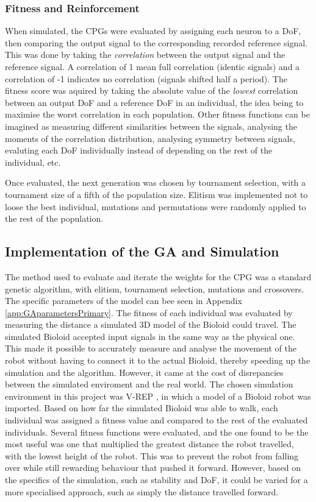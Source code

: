 \subsubsection{Fitness and Reinforcement}
When simulated, the CPGs were evaluated by assigning each neuron to a DoF, then comparing the output signal to the corresponding recorded reference signal. This was done by taking the \textit{correlation} between the output signal and the reference signal. A correlation of 1 mean full correlation (identic signals) and a correlation of -1 indicates no correlation (signals shifted half a period). The fitness score was aquired by taking the absolute value of the \textit{lowest} correlation between an output DoF and a reference DoF in an individual, the idea being to maximise the worst correlation in each population. Other fitness functions can be imagined as measuring different similarities between the signals, analysing the moments of the correlation distribution, analysing symmetry between signals, evaluting each DoF individually instead of depending on the rest of the individual, etc. 

Once evaluated, the next generation was chosen by tournament selection, with a tournament size of a fifth of the population size. Elitism was implemented not to loose the best individual, mutations and permutations were randomly applied to the rest of the population. 

\subsection{Implementation of the GA and Simulation}
The method used to evaluate and iterate the weights for the CPG was a standard genetic algorithm, with elitism, tournament selection, mutations and crossovers. The specific parameters of the model can bee seen in Appendix \ref{app:GAparametersPrimary}. The fitness of each individual was evaluated by measuring the distance a simulated 3D model of the Bioloid could travel. The simulated Bioloid accepted input signals in the same way as the physical one. This made it possible to accurately measure and analyse the movement of the robot without having to connect it to the actual Bioloid, thereby speeding up the simulation and the algorithm. However, it came at the cost of disrepancies between the simulated enviroment and the real world. The chosen simulation environment in this project was V-REP \cite{v-rep}, in which a model of a Bioloid robot was imported. Based on how far the simulated Bioloid was able to walk, each individual was assigned a fitness value and compared to the rest of the evaluated individuals. Several fitness functions were evaluated, and the one found to be the most useful was one that multiplied the greatest distance the robot travelled, with the lowest height of the robot. This was to prevent the robot from falling over while still rewarding behaviour that pushed it forward. However, based on the specifics of the simulation, such as stability and DoF, it could be varied for a more specialised approach, such as simply the distance travelled forward.

